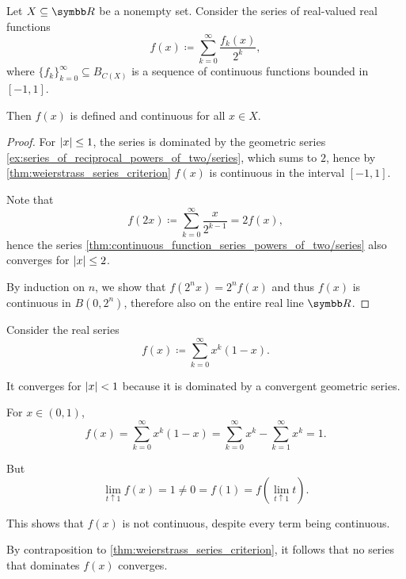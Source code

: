 \begin{corollary}\label{thm:continuous_function_series_powers_of_two}
  Let \( X \subseteq \BR \) be a nonempty set. Consider the series of real-valued real functions
  \begin{equation}\label{thm:continuous_function_series_powers_of_two/series}
    f(x) \coloneqq \sum_{k=0}^\infty \frac {f_k(x)} {2^k},
  \end{equation}
  where \( \{ f_k \}_{k=0}^\infty \subseteq B_{C(X)} \) is a sequence of continuous functions bounded in \( [-1, 1] \).

  Then \( f(x) \) is defined and continuous for all \( x \in X \).
\end{corollary}
\begin{proof}
  For \( \left\vert x \right\vert \leq 1 \), the series is dominated by the geometric series \cref{ex:series_of_reciprocal_powers_of_two/series}, which sums to \( 2 \), hence by \cref{thm:weierstrass_series_criterion} \( f(x) \) is continuous in the interval \( [-1, 1] \).

  Note that
  \begin{equation*}
    f(2x) \coloneqq \sum_{k=0}^\infty \frac x {2^{k-1}} = 2 f(x),
  \end{equation*}
  hence the series \cref{thm:continuous_function_series_powers_of_two/series} also converges for \( \left\vert x \right\vert \leq 2 \).

  By induction on \( n \), we show that \( f(2^n x) = 2^n f(x) \) and thus \( f(x) \) is continuous in \( B(0, 2^n) \), therefore also on the entire real line \( \BR \).
\end{proof}

\begin{example}\label{thm:weierstrass_series_criterion/counterexample}\cite[]{Фихтенгольц1968/2}
  Consider the real series
  \begin{equation*}
    f(x) \coloneqq \sum_{k=0}^\infty x^k (1 - x).
  \end{equation*}

  It converges for \( \left\vert x \right\vert < 1 \) because it is dominated by a convergent geometric series.

  For \( x \in (0, 1) \),
  \begin{equation*}
    f(x)
    =
    \sum_{k=0}^\infty x^k (1 - x)
    =
    \sum_{k=0}^\infty x^k - \sum_{k=1}^\infty x^k
    =
    1.
  \end{equation*}

  But
  \begin{equation*}
    \lim_{t \uparrow 1} f(x) = 1 \neq 0 = f(1) = f(\lim_{t \uparrow 1} t).
  \end{equation*}

  This shows that \( f(x) \) is not continuous, despite every term being continuous.

  By contraposition to \cref{thm:weierstrass_series_criterion}, it follows that no series that dominates \( f(x) \) converges.
\end{example}

